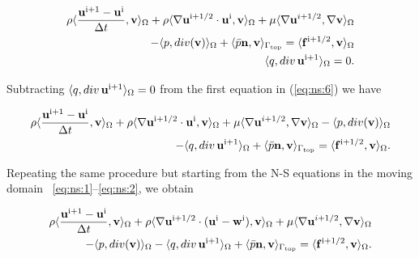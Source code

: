 \documentclass[a4paper,11pt,openright,twoside]{book}
\begin{document}
\begin{equation}
\label{eq:ns:6}
\begin{split}
\rho \langle \frac{\mathbf{u}^{\rm i+1} - \mathbf{u}^{\rm i}}{\Delta t}, \mathbf{v} \rangle_\Omega
+ \rho \langle \nabla \mathbf{u}^{\rm i+1/2} \cdot \mathbf{u}^{\rm i}, \mathbf{v} \rangle_\Omega
+ \mu \langle \nabla \mathbf{u}^{i+1/2} , \nabla \mathbf{v} \rangle_\Omega \\
- \langle p , div(\mathbf{v}) \rangle_\Omega 
+ \langle \bar{p} \mathbf{n}, \mathbf{v} \rangle_{\Gamma_{\rm top}}
= \langle \mathbf{f}^{\rm i + 1/2}, \mathbf{v} \rangle_\Omega \\
\langle q , div \, \mathbf{u}^{\rm i+1} \rangle_\Omega = 0.
\end{split}
\end{equation}

Subtracting $\langle q , div \, \mathbf{u}^{\rm i+1} \rangle_\Omega = 0$ from the first equation in (\ref{eq:ns:6}) we have

\begin{equation}
\begin{split}
\rho \langle \frac{\mathbf{u}^{\rm i+1} - \mathbf{u}^{\rm i}}{\Delta t}, \mathbf{v} \rangle_\Omega
+ \rho \langle \nabla \mathbf{u}^{\rm i+1/2} \cdot \mathbf{u}^{\rm i}, \mathbf{v} \rangle_\Omega
+ \mu \langle \nabla \mathbf{u}^{i+1/2} , \nabla \mathbf{v} \rangle_\Omega
- \langle p , div(\mathbf{v}) \rangle_\Omega \\
- \langle q , div \, \mathbf{u}^{\rm i+1} \rangle_\Omega 
+ \langle \bar{p} \mathbf{n}, \mathbf{v} \rangle_{\Gamma_{\rm top}}
= \langle \mathbf{f}^{\rm i + 1/2}, \mathbf{v} \rangle_\Omega.
\end{split}
\end{equation}

Repeating the same procedure but starting from the N-S equations in the moving domain ~\eqref{eq:ns:1}--\eqref{eq:ns:2}, we obtain

\begin{equation}
\begin{split}
\rho \langle \frac{\mathbf{u}^{\rm i+1} - \mathbf{u}^{\rm i}}{\Delta t}, \mathbf{v} \rangle_\Omega
+ \rho \langle \nabla \mathbf{u}^{\rm i+1/2} \cdot (\mathbf{u}^{\rm i} - \mathbf{w}^{\rm i}), \mathbf{v} \rangle_\Omega
+ \mu \langle \nabla \mathbf{u}^{i+1/2} , \nabla \mathbf{v} \rangle_\Omega \\
- \langle p , div(\mathbf{v}) \rangle_\Omega
- \langle q , div \, \mathbf{u}^{\rm i+1} \rangle_\Omega 
+ \langle \bar{p} \mathbf{n}, \mathbf{v} \rangle_{\Gamma_{\rm top}}
= \langle \mathbf{f}^{\rm i + 1/2}, \mathbf{v} \rangle_\Omega.
\end{split}
\end{equation}
\end{document}
